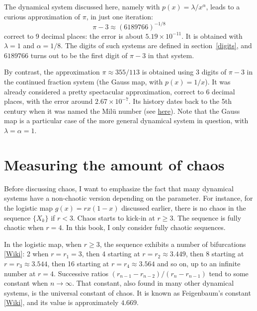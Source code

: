 \documentclass[oneside,10pt]{book}
\begin{document}
The dynamical system discussed here, namely with $p(x)=\lambda/x^\alpha$, leads to a curious approximation of $\pi$, in just one iteration:
$$
\pi - 3 \approx (6189766)^{-1/8}
$$
correct to 9 decimal places: the error is about $5.19\times 10^{-11}$. It is obtained with $\lambda=1$ and $\alpha=1/8$. The digits of such systems are defined in
section~\ref{digits}, and $6189766$ turns out to be the first digit of $\pi-3$ in that system.

By contrast, the
 approximation $\pi \approx 355/113$ is obtained using 3 digits of $\pi-3$ in the continued fraction system (the Gauss map, with
 $p(x)=1/x$). It was
already considered a pretty spectacular approximation, correct to 6 decimal places, with the error
 around $2.67\times 10^{-7}$. Its history dates back to the 5th century
 when it was named the Milü number (see \href{https://en.wikipedia.org/wiki/Mil\%C3\%BC}{here}). Note that the Gauss map is a particular case of the more general dynamical system in question, with
 $\lambda=\alpha=1$.


\section{Measuring the amount of chaos}

Before discussing chaos, I want to emphasize the fact that many dynamical systems have a non-chaotic version depending on the parameter.
 For instance, for the \textcolor{index}{logistic map} $g(x)=r x(1-x)$ discussed earlier,
  there is no chaos in the sequence $\{X_k\}$ if $r<3$. Chaos starts to kick-in at $r\geq 3$. The sequence is fully chaotic when
 $r=4$. In this book, I only consider fully chaotic sequences.

In the logistic map, when $r\geq 3$, the sequence exhibits a number of \textcolor{index}{bifurcations} [\href{https://en.wikipedia.org/wiki/Bifurcation_theory}{Wiki}]:
 2 when $r=r_1=3$, then 4 starting at $r=r_2 \approx 3.449$, then 8 starting at $r=r_3 \approx 3.544$,
 then 16 starting at $r =r_4 \approx  3.564$ and so on, up
 to an infinite number at $r=4$. Successive ratios $(r_{n-1}-r_{n-2})/(r_n - r_{n-1})$ tend to some constant when $n\rightarrow \infty$.
 That constant, also found in many other dynamical systems, is the universal constant of chaos. It is known
 as \textcolor{index}{Feigenbaum's constant} [\href{https://en.wikipedia.org/wiki/Feigenbaum_constants}{Wiki}], and its value is approximately $4.669$.
\end{document}

